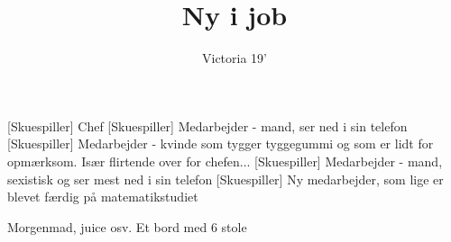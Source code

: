 \documentclass[a4paper,11pt]{article}
\title{Ny i job}
\author{Victoria 19'}
\begin{document}
\maketitle

\begin{roles}
[Skuespiller] Chef 
[Skuespiller] Medarbejder - mand, ser ned i sin telefon
[Skuespiller] Medarbejder - kvinde som tygger tyggegummi og som er lidt for opmærksom. Især flirtende over for chefen...
[Skuespiller] Medarbejder - mand, sexistisk og ser mest ned i sin telefon
[Skuespiller] Ny medarbejder, som lige er blevet færdig på matematikstudiet
\end{roles}

\begin{props}
 Morgenmad, juice osv. 
 Et bord med 6 stole
\end{props}
\end{document}
